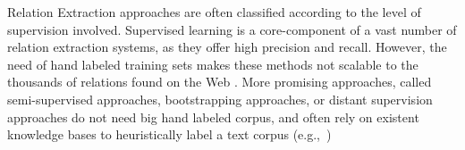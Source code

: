 Relation Extraction approaches are often classified according to the level of supervision involved.
Supervised learning is a core-component of a vast number of relation extraction systems, as they offer high precision and recall. However, the need of hand labeled training sets makes these methods not scalable to the thousands of relations found on the Web \citep{Hoffmann2011}.
More promising approaches, called semi-supervised approaches, bootstrapping approaches, or distant supervision approaches do not need big hand labeled corpus, and
often rely on existent knowledge bases to heuristically label a text corpus (e.g.,~\citep{Carlson2010,Hoffmann2011})

